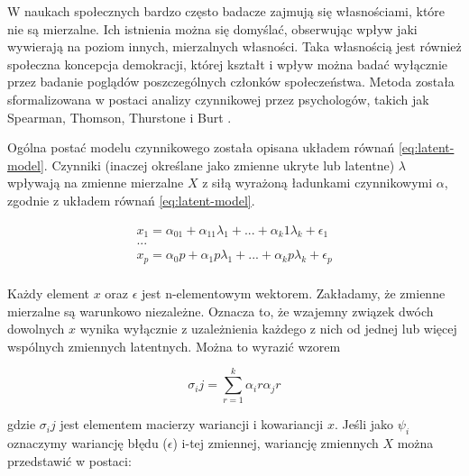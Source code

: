 \documentclass[12pt]{article}
\begin{document}
W naukach społecznych bardzo często badacze zajmują się własnościami, które nie są mierzalne. Ich istnienia można się domyślać, obserwując wpływ jaki wywierają na poziom innych, mierzalnych własności. Taka własnością jest również społeczna koncepcja demokracji, której kształt i wpływ można badać wyłącznie przez badanie poglądów poszczególnych członków społeczeństwa. Metoda została sformalizowana w postaci analizy czynnikowej przez psychologów, takich jak Spearman, Thomson, Thurstone i Burt \citep{Everitt}.

Ogólna postać modelu czynnikowego została opisana układem równań \ref{eq:latent-model}. Czynniki (inaczej określane jako zmienne ukryte lub latentne) \(\lambda\) wpływają na zmienne mierzalne \(X\) z siłą wyrażoną ładunkami czynnikowymi \(\alpha\), zgodnie z układem równań \ref{eq:latent-model}.

\begin{equation}
\label{eq:latent-model}
\begin{aligned} 
x_1 = \alpha_01 + \alpha_11 \lambda_1 + ... + \alpha_k1 \lambda_k + \epsilon_1\\
...\\
x_p = \alpha_0p + \alpha_1p \lambda_1 + ... + \alpha_kp \lambda_k + \epsilon_p\\
\end{aligned}
\end{equation}

Każdy element \(x\) oraz \(\epsilon\) jest n-elementowym wektorem. Zakładamy, że zmienne mierzalne są warunkowo niezależne. Oznacza to, że wzajemny związek dwóch dowolnych \(x\) wynika wyłącznie z uzależnienia każdego z nich od jednej lub więcej wspólnych zmiennych latentnych. Można to wyrazić wzorem

\begin{equation}
\label{eq:shared-var}
\sigma_ij = \sum_{r=1}^k \alpha_ir \alpha_jr
\end{equation}

gdzie \(\sigma_ij\) jest elementem macierzy wariancji i kowariancji \(x\).
Jeśli jako \(\psi_i\) oznaczymy wariancję błędu (\(\epsilon\)) i-tej zmiennej, wariancję zmiennych \(X\) można przedstawić w postaci:



\end{document}

